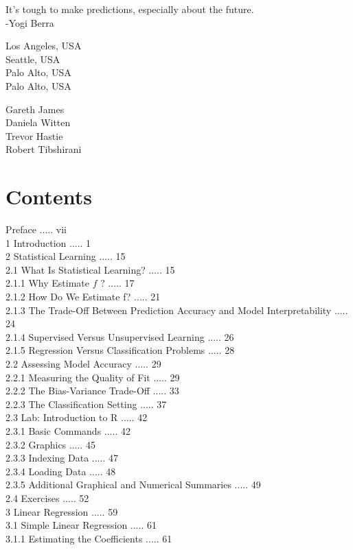 \documentclass[10pt]{article}
\begin{document}
It's tough to make predictions, especially about the future.\\
-Yogi Berra

Los Angeles, USA\\
Seattle, USA\\
Palo Alto, USA\\
Palo Alto, USA

Gareth James\\
Daniela Witten\\
Trevor Hastie\\
Robert Tibshirani

\section*{Contents}
Preface ..... vii\\
1 Introduction ..... 1\\
2 Statistical Learning ..... 15\\
2.1 What Is Statistical Learning? ..... 15\\
2.1.1 Why Estimate $f$ ? ..... 17\\
2.1.2 How Do We Estimate f? ..... 21\\
2.1.3 The Trade-Off Between Prediction Accuracy and Model Interpretability ..... 24\\
2.1.4 Supervised Versus Unsupervised Learning ..... 26\\
2.1.5 Regression Versus Classification Problems ..... 28\\
2.2 Assessing Model Accuracy ..... 29\\
2.2.1 Measuring the Quality of Fit ..... 29\\
2.2.2 The Bias-Variance Trade-Off ..... 33\\
2.2.3 The Classification Setting ..... 37\\
2.3 Lab: Introduction to R ..... 42\\
2.3.1 Basic Commands ..... 42\\
2.3.2 Graphics ..... 45\\
2.3.3 Indexing Data ..... 47\\
2.3.4 Loading Data ..... 48\\
2.3.5 Additional Graphical and Numerical Summaries ..... 49\\
2.4 Exercises ..... 52\\
3 Linear Regression ..... 59\\
3.1 Simple Linear Regression ..... 61\\
3.1.1 Estimating the Coefficients ..... 61\\
\end{document}
